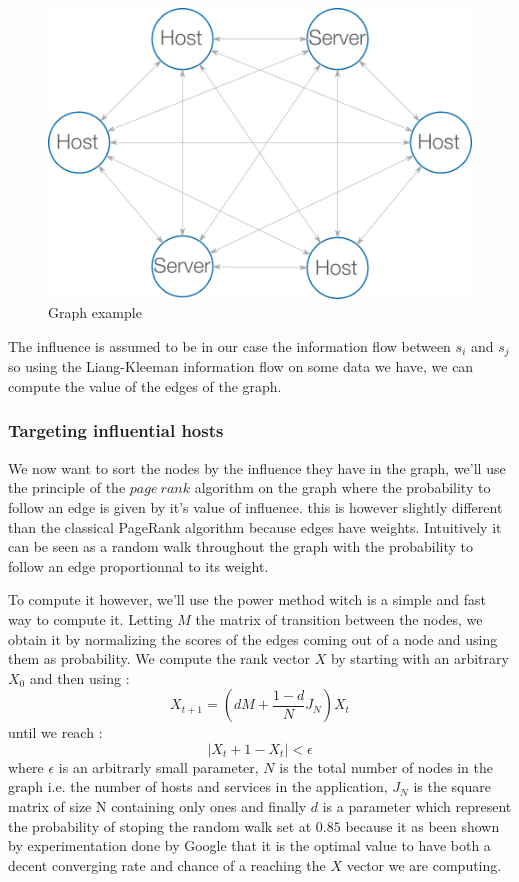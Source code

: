 \documentclass[10pt,a4paper,oneside]{article}
\begin{document}
\begin{figure}[!h]
\centering
\includegraphics[scale=0.6]{./images/PNG/Graphe.png}
\caption{Graph example}
\label{graphe}
\end{figure}

\begin{multicols}{2}
The influence is assumed to be in our case the information flow between $s_i$ and $s_j$ so using the Liang-Kleeman information flow \cite{infoflow} on some data we have, we can compute the value of the edges of the graph.

\subsubsection{Targeting influential hosts}
We now want to sort the nodes by the influence they have in the graph, we'll use the principle of the $page~rank$ algorithm \cite{pagerank} on the graph where the probability to follow an edge is given by it's value of influence. this is however slightly different than the classical PageRank algorithm because edges have weights. Intuitively it can be seen as a random walk throughout the graph with the probability to follow an edge proportionnal to its weight.

To compute it however, we'll  use the power method witch is a simple and fast way to compute it. Letting $M$ the matrix of transition between the nodes, we obtain it by normalizing the scores of the edges coming out of a node and using them as probability. We compute the rank vector $X$ by starting with an arbitrary $X_0$ and then using :
	\[X_{t+1} = (dM + \frac{1-d}{N}J_N)X_t\]
until we reach :
	\[ \mid{X_t+1 - X_t}\mid < \epsilon\]
where $\epsilon$ is an arbitrarly small parameter, $N$ is the total number of nodes in the graph i.e. the number of hosts and services in the application, $J_N$ is the square matrix of size N containing only ones and finally $d$ is a parameter which represent the probability of stoping the random walk set at $0.85$ because it as been shown by experimentation done by Google that it is the optimal value to have both a decent converging rate and chance of a reaching the $X$ vector we are computing.
\end{multicols}
\end{document}
